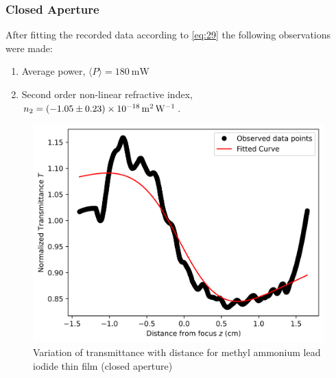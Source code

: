\documentclass[%
 reprint,
 amsmath,amssymb,
 aps,
]{revtex4-2}
\begin{document}
		\subsubsection{Closed Aperture}
		After fitting the recorded data according to \eqref{eq:29} the following observations were made:
		\begin{enumerate} 
			\item Average power, $ \langle P \rangle  = \SI{180}{\milli \watt}$
			\item Second order non-linear refractive index, $ n_2 = \SI[separate-uncertainty=true]{-1.05 \pm 0.23e-18}{\meter \squared \per \watt} $.
		\end{enumerate}
		\begin{figure}
			\includegraphics[scale = 0.59]{satys-c}
			\caption{Variation of transmittance with distance for methyl ammonium lead iodide thin film (closed aperture)}
		\end{figure}
		
\end{document}
